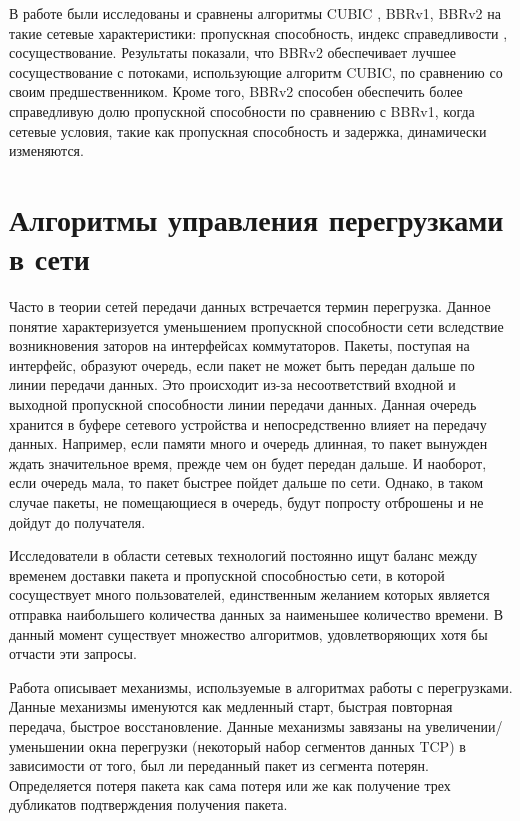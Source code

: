 В работе \cite{article_apeotba} были исследованы и сравнены алгоритмы
CUBIC \cite{rfc8312}, BBRv1, BBRv2 на такие сетевые характеристики:
пропускная способность, индекс справедливости \cite{rfc5166},
сосуществование. Результаты показали, что BBRv2 обеспечивает лучшее
сосуществование с потоками, использующие алгоритм CUBIC, по сравнению
со своим предшественником. Кроме того, BBRv2 способен обеспечить более
справедливую долю пропускной способности по сравнению с BBRv1, когда
сетевые условия, такие как пропускная способность и задержка,
динамически изменяются.

\section{Алгоритмы управления перегрузками в
  сети}

Часто в теории сетей передачи данных встречается термин
перегрузка. Данное понятие характеризуется уменьшением пропускной
способности сети вследствие возникновения заторов на интерфейсах
коммутаторов. Пакеты, поступая на интерфейс, образуют очередь, если
пакет не может быть передан дальше по линии передачи данных. Это
происходит из-за несоответствий входной и выходной пропускной
способности линии передачи данных. Данная очередь хранится в буфере
сетевого устройства и непосредственно влияет на передачу данных. Например,
если памяти много и очередь длинная, то пакет вынужден ждать
значительное время, прежде чем он будет передан дальше. И наоборот, если
очередь мала, то пакет быстрее пойдет дальше по сети. Однако, в таком
случае пакеты, не помещающиеся в очередь, будут попросту отброшены и
не дойдут до получателя.

Исследователи в области сетевых технологий постоянно ищут баланс между
временем доставки пакета и пропускной способностью сети, в которой
сосуществует много пользователей, единственным желанием которых является
отправка наибольшего количества данных за наименьшее количество времени.
В данный момент существует множество алгоритмов, удовлетворяющих хотя
бы отчасти эти запросы.

Работа \cite{rfc2001} описывает механизмы, используемые в алгоритмах
работы с перегрузками. Данные механизмы именуются как медленный старт,
быстрая повторная передача, быстрое восстановление. Данные механизмы
завязаны на увеличении/уменьшении окна перегрузки (некоторый набор
сегментов данных TCP) в зависимости от того, был ли переданный пакет из
сегмента потерян. Определяется потеря пакета как сама потеря или же как
получение трех дубликатов подтверждения получения пакета.

